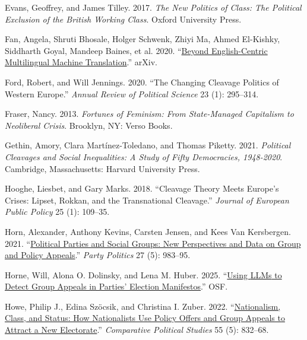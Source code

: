 \documentclass[12pt]{article}
\newlength{\cslhangindent}
\newenvironment{CSLReferences}[2]
  {\begin{list}{}{%
    \setlength{\itemindent}{0pt}
    \setlength{\leftmargin}{0pt}
    \setlength{\parsep}{0pt}
    \ifodd #1
      \setlength{\leftmargin}{\cslhangindent}
      \setlength{\itemindent}{-\cslhangindent}
    \fi
    \setlength{\itemsep}{#2\baselineskip}}}
  {\end{list}}
\begin{document}
\begin{CSLReferences}{1}{0}
Evans, Geoffrey, and James Tilley. 2017. \emph{The New Politics of Class: The Political Exclusion of the British Working Class}. Oxford University Press.

Fan, Angela, Shruti Bhosale, Holger Schwenk, Zhiyi Ma, Ahmed El-Kishky, Siddharth Goyal, Mandeep Baines, et al. 2020. {``\href{https://doi.org/10.48550/arXiv.2010.11125}{Beyond English-Centric Multilingual Machine Translation}.''} {arXiv}.

Ford, Robert, and Will Jennings. 2020. {``The Changing Cleavage Politics of Western Europe.''} \emph{Annual Review of Political Science} 23 (1): 295--314.

Fraser, Nancy. 2013. \emph{Fortunes of Feminism: From State-Managed Capitalism to Neoliberal Crisis}. Brooklyn, {NY}: Verso Books.

Gethin, Amory, Clara Martínez-Toledano, and Thomas Piketty. 2021. \emph{Political Cleavages and Social Inequalities: A Study of Fifty Democracies, 1948-2020}. Cambridge, Massachusetts: Harvard University Press.

Hooghe, Liesbet, and Gary Marks. 2018. {``Cleavage Theory Meets Europe's Crises: Lipset, Rokkan, and the Transnational Cleavage.''} \emph{Journal of European Public Policy} 25 (1): 109--35.

Horn, Alexander, Anthony Kevins, Carsten Jensen, and Kees Van Kersbergen. 2021. {``\href{https://doi.org/10.1177/1354068820907998}{Political Parties and Social Groups: New Perspectives and Data on Group and Policy Appeals}.''} \emph{Party Politics} 27 (5): 983--95.

Horne, Will, Alona O. Dolinsky, and Lena M. Huber. 2025. {``\href{https://doi.org/10.31219/osf.io/fp2h3_v2}{Using {LLMs} to Detect Group Appeals in Parties' Election Manifestos}.''} {OSF}.

Howe, Philip J., Edina Szöcsik, and Christina I. Zuber. 2022. {``\href{https://doi.org/10.1177/00104140211036033}{Nationalism, Class, and Status: How Nationalists Use Policy Offers and Group Appeals to Attract a New Electorate}.''} \emph{Comparative Political Studies} 55 (5): 832--68.


\end{CSLReferences}
\end{document}
